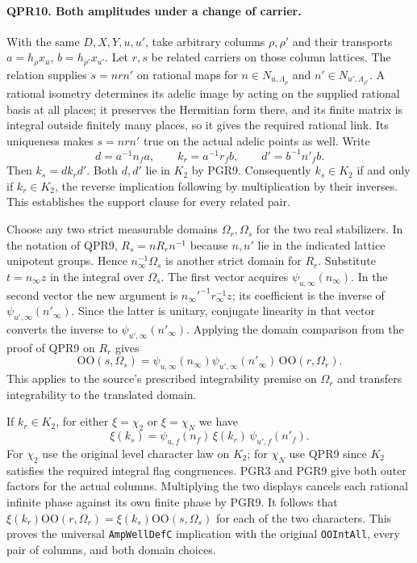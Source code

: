 \paragraph{QPR10. Both amplitudes under a change of carrier.}
With the same $D,X,Y,u,u'$, take arbitrary columns $\rho,\rho'$
and their transports $a=h_\rho x_u$, $b=h_{\rho'}x_{u'}$. Let
$r,s$ be related carriers on those column lattices. The relation
supplies $s=n r n'$ on rational maps for
$n\in N_{u,\Lambda_\rho}$ and $n'\in N_{u',\Lambda_{\rho'}}$.
A rational isometry determines its adelic image by acting on the
supplied rational basis at all places; it preserves the Hermitian
form there, and its finite matrix is integral outside finitely many
places, so it gives the required rational link. Its uniqueness makes
$s=n r n'$ true on the actual adelic points as well. Write
\[
 d=a^{-1}n_f a,\qquad k_r=a^{-1}r_f b,\qquad d'=b^{-1}n'_f b .
\]
Then $k_s=d k_r d'$. Both $d,d'$ lie in $K_2$ by PGR9.
Consequently $k_s\in K_2$ if and only if $k_r\in K_2$, the reverse
implication following by multiplication by their inverses. This
establishes the support clause for every related pair.

Choose any two strict measurable domains $\Omega_r,\Omega_s$ for
the two real stabilizers. In the notation of QPR9,
$R_s=nR_r n^{-1}$ because $n,n'$ lie in the indicated lattice
unipotent groups. Hence $n_\infty^{-1}\Omega_s$ is another strict
domain for $R_r$. Substitute $t=n_\infty z$ in the integral over
$\Omega_s$. The first vector acquires $\psi_{u,\infty}(n_\infty)$.
In the second vector the new argument is
$n_\infty'^{-1}r_\infty^{-1}z$; its coefficient is the inverse
of $\psi_{u',\infty}(n'_\infty)$. Since the latter is unitary,
conjugate linearity in that vector converts the inverse to
$\psi_{u',\infty}(n'_\infty)$. Applying the domain comparison
from the proof of QPR9 on $R_r$ gives
\[
 \mathrm{OO}(s,\Omega_s)=
 \psi_{u,\infty}(n_\infty)\psi_{u',\infty}(n'_\infty)
                         \,\mathrm{OO}(r,\Omega_r).
\]
This applies to the source's prescribed integrability premise on
$\Omega_r$ and transfers integrability to the translated domain.

If $k_r\in K_2$, for either $\xi=\chi_2$ or $\xi=\chi_N$ we have
\[
 \xi(k_s)=\psi_{u,f}(n_f)\,\xi(k_r)\,\psi_{u',f}(n'_f).
\]
For $\chi_2$ use the original level character law on $K_2$; for
$\chi_N$ use QPR9 since $K_2$ satisfies the required integral
flag congruences. PGR3 and PGR9 give both outer factors for the
actual columns. Multiplying the two displays cancels each rational
infinite phase against its own finite phase by PGR9. It follows
that $\xi(k_r)\mathrm{OO}(r,\Omega_r)=
\xi(k_s)\mathrm{OO}(s,\Omega_s)$ for each of the two characters.
This proves the universal \texttt{AmpWellDefC} implication with
the original \texttt{OOIntAll}, every pair of columns, and both
domain choices.


